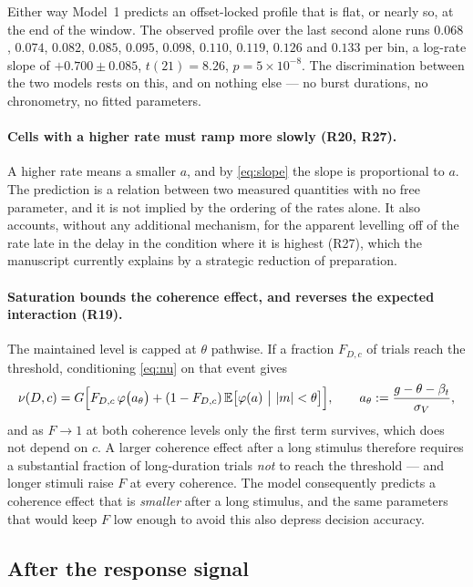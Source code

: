 \documentclass[a4paper,11pt]{article}
\newcommand{\E}{\mathbb E}
\newcommand{\1}{\mathbbm{1}}
\begin{document}
Either way Model~1 predicts an offset-locked profile that is flat, or nearly so, at the end
of the window. The observed profile over the last second alone runs $0.068$, $0.074$,
$0.082$, $0.085$, $0.095$, $0.098$, $0.110$, $0.119$, $0.126$ and $0.133$ per bin, a
log-rate slope of $+0.700\pm0.085$, $t(21)=8.26$, $p=5\times10^{-8}$. The discrimination
between the two models rests on this, and on nothing else --- no burst durations, no
chronometry, no fitted parameters.

\paragraph{Cells with a higher rate must ramp more slowly (R20, R27).} A higher rate means a smaller
$a$, and by \eqref{eq:slope} the slope is proportional to $a$. The prediction is a
relation between two measured quantities with no free parameter, and it is not implied by
the ordering of the rates alone. It also accounts, without any additional mechanism, for
the apparent levelling off of the rate late in the delay in the condition where it is
highest (R27), which the manuscript currently explains by a strategic reduction of
preparation.

\paragraph{Saturation bounds the coherence effect, and reverses the expected
interaction (R19).} The maintained level is capped at $\theta$ pathwise. If a fraction $F_{D,c}$
of trials reach the threshold, conditioning \eqref{eq:nu} on that event gives
\begin{equation}
\nu(D,c)=G\Bigl[F_{D,c}\,\varphi\bigl(a_\theta\bigr)
+(1-F_{D,c})\,\E\bigl[\varphi(a)\ \big|\ |m|<\theta\bigr]\Bigr],
\qquad a_\theta:=\frac{g-\theta-\beta_t}{\sigma_V},
\end{equation}
and as $F\to1$ at both coherence levels only the first term survives, which does not
depend on $c$. A larger coherence effect after a long stimulus therefore requires a
substantial fraction of long-duration trials \emph{not} to reach the threshold --- and
longer stimuli raise $F$ at every coherence. The model consequently predicts a coherence
effect that is \emph{smaller} after a long stimulus, and the same parameters that would
keep $F$ low enough to avoid this also depress decision accuracy.

\subsection{After the response signal}
\end{document}
